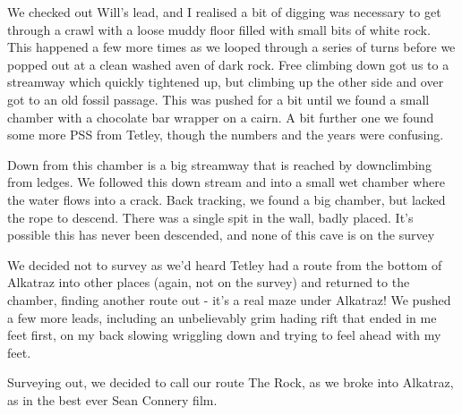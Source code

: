 We checked out Will’s lead, and I realised a bit of digging was necessary to get through a crawl with a loose muddy floor filled with small bits of white rock. This happened a few more times as we looped through a series of turns before we popped out at a clean washed aven of dark rock. Free climbing down got us to a streamway which quickly tightened up, but climbing up the other side and over got to an old fossil passage. This was pushed for a bit until we found a small chamber with a chocolate bar wrapper on a cairn. A bit further one we found some more PSS from Tetley, though the numbers and the years were confusing.

Down from this chamber is a big streamway that is reached by downclimbing from ledges. We followed this down stream and into a small wet chamber where the water flows into a crack. Back tracking, we found a big chamber, but lacked the rope to descend. There was a single spit in the wall, badly placed. It’s possible this has never been descended, and none of this cave is on the survey

We decided not to survey as we’d heard Tetley had a route from the bottom of Alkatraz into other places (again, not on the survey) and returned to the chamber, finding another route out - it’s a real maze under Alkatraz! We pushed a few more leads, including an unbelievably grim hading rift that ended in me feet first, on my back slowing wriggling down and trying to feel ahead with my feet.

Surveying out, we decided to call our route The Rock, as we broke into Alkatraz, as in the best ever Sean Connery film.

